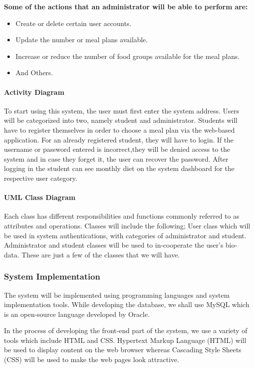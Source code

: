 \documentclass{article}
\begin{document}
\textbf{Some of the actions that an administrator will be able to perform are:}
\begin{itemize}
\item Create or delete certain user accounts.
\item Update the number or meal plans available.
\item Increase or reduce the number of food groups available for the meal plans.
\item And Others.
\end{itemize}

\paragraph{Activity Diagram \\}
To start using this system, the user must first enter the system address. Users will be categorized into two, namely student and administrator. Students will have to register themselves in order to choose a meal plan via the web-based application. For an already registered student, they will have to login. If the username or password entered is incorrect,they will be denied access to the system and in case they forget it, the user can recover the password. After logging in the student can see monthly diet on the system dashboard for the respective user category.

\paragraph{UML Class Diagram \\}

Each class has different responsibilities and functions commonly referred to as attributes and operations. Classes will include the following; User class which will be used in system authentications, with categories of administrator and student. Administrator and student classes will be used to in-cooperate the user’s bio-data. These are just a few of the classes that we will have.

\subsubsection{System Implementation}
The system will be implemented using programming languages and system implementation tools. While developing the database, we shall use MySQL which is an open-source language developed by Oracle.  

In the process of developing the front-end part of the system, we use a variety of tools which include HTML and CSS.  Hypertext Markup Language (HTML) will be used to display content on the web browser whereas Cascading Style Sheets (CSS) will be used to make the web pages look attractive. 
\end{document}
